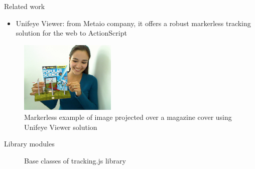 \documentclass{beamer}
\begin{document}
\begin{frame}{Related work}
  \begin{itemize}
    \item Unifeye Viewer: from Metaio company, it offers a robust markerless tracking solution for the web to ActionScript
  \end{itemize}
  \begin{figure}[!htb]
    \centering
    \includegraphics[width=130pt]{../chapters/tracking_library_for_the_web/unifeyeviewer.png}
    \caption{Markerless example of image projected over a magazine cover using Unifeye Viewer solution}
    \label{figure:unifeyeviewer}
  \end{figure}
\end{frame}
\begin{frame}{Library modules}
  \begin{figure}[!htb]
      \caption{Base classes of tracking.js library}
      \label{figure:base_classes}
  \end{figure}
\end{frame}
\end{document}
